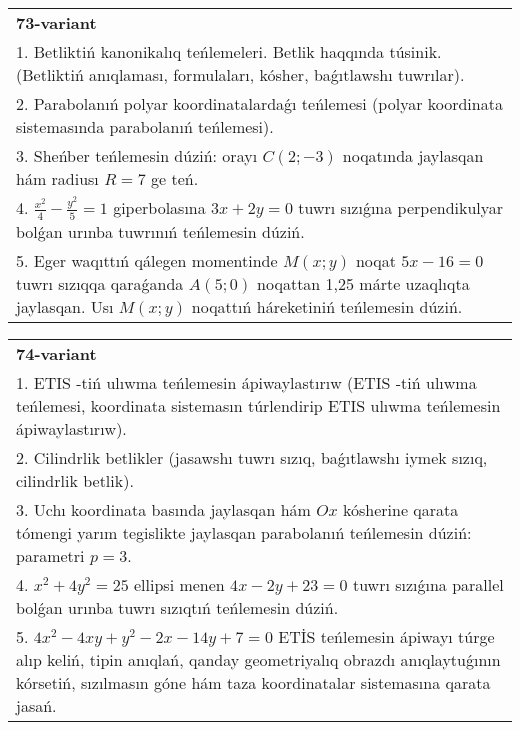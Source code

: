\documentclass{article}
\begin{document}
\begin{tabular}{m{17cm}}
\textbf{73-variant}\\
1. Betliktiń kanonikalıq teńlemeleri. Betlik haqqında túsinik. (Betliktiń anıqlaması, formulaları, kósher, baǵıtlawshı tuwrılar).\\

2. Parabolanıń polyar koordinatalardaǵı teńlemesi (polyar koordinata sistemasında parabolanıń teńlemesi).\\

3. Sheńber teńlemesin dúziń: orayı $C (2;-3) $ noqatında jaylasqan hám radiusı $R=7$ ge teń.\\

4. $\frac{x^{2}}{4} - \frac{y^{2}}{5} = 1$ giperbolasına $3x + 2y = 0$ tuwrı sızıǵına perpendikulyar bolǵan urınba tuwrınıń teńlemesin dúziń.\\

5. Eger waqıttıń qálegen momentinde $M(x;y)$ noqat $5x - 16 = 0$ tuwrı sızıqqa qaraǵanda $A(5;0)$ noqattan 1,25 márte uzaqlıqta jaylasqan. Usı $M(x;y)$ noqattıń háreketiniń teńlemesin dúziń.  
\end{tabular}
\vspace{1cm}


\begin{tabular}{m{17cm}}
\textbf{74-variant}\\
1. ETIS -tiń ulıwma teńlemesin ápiwaylastırıw (ETIS -tiń ulıwma teńlemesi, koordinata sistemasın túrlendirip ETIS ulıwma teńlemesin ápiwaylastırıw).\\

2. Cilindrlik betlikler (jasawshı tuwrı sızıq, baǵıtlawshı iymek sızıq, cilindrlik betlik).\\

3. Uchı koordinata basında jaylasqan hám $Ox$ kósherine qarata tómengi yarım tegislikte jaylasqan parabolanıń teńlemesin dúziń: parametri $p=3$.\\

4. $x^{2} + 4y^{2} = 25$ ellipsi menen $4x - 2y + 23 = 0$ tuwrı sızıǵına parallel bolǵan urınba tuwrı sızıqtıń teńlemesin dúziń.  \\

5. $4x^{2} - 4xy + y^{2} - 2x - 14y + 7 = 0$ ETİS teńlemesin ápiwayı túrge alıp keliń, tipin anıqlań, qanday geometriyalıq obrazdı anıqlaytuǵının kórsetiń, sızılmasın góne hám taza koordinatalar sistemasına qarata jasań.  
\end{tabular}
\vspace{1cm}
\end{document}

